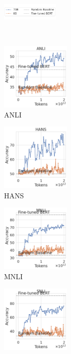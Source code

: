 \begin{figure}[t]
    \begin{subfigure}[b]{\textwidth}
        \includegraphics[width=0.3\textwidth]{figures/training_legend}
        \vspace{-2mm}
    \end{subfigure}\\
    \begin{subfigure}[b]{0.20\textwidth}
    \centering
    \includegraphics[height=3.2cm]{figures/anli_intermediate}
    \caption{ANLI}
    \end{subfigure}
    \label{fig:anli_int}
    \begin{subfigure}[b]{0.19\textwidth}
    \centering
    \includegraphics[height=3.2cm, trim=11mm 0 0 0, clip]{figures/hansnli_intermediate}
    \caption{HANS}
    \label{fig:hans_int}
    \end{subfigure}
    \begin{subfigure}[b]{0.19\textwidth}
    \centering
    \includegraphics[height=3.2cm, trim=11mm 0 0 0, clip]{figures/mnli_matched_intermediate}
    \caption{MNLI}
    \label{fig:mnli_int}
    \end{subfigure}
    \begin{subfigure}[b]{0.19\textwidth}
    \centering
    \includegraphics[height=3.2cm, trim=11mm 0 0 0, clip]{figures/snli_intermediate}

\end{subfigure}
\end{figure}
